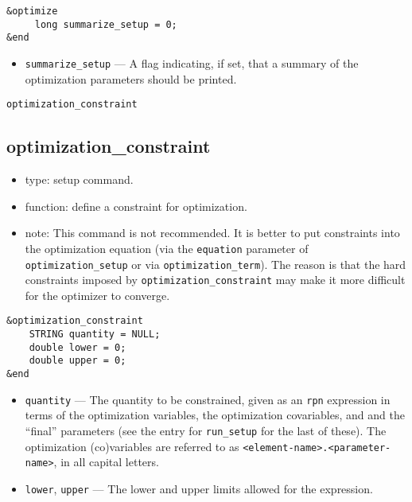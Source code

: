 \documentclass[11pt]{article}
\begin{document}
\begin{verbatim}
&optimize
     long summarize_setup = 0;
&end
\end{verbatim}

\begin{itemize}

\item \verb|summarize_setup| --- A flag indicating, if set, that a
summary of the optimization parameters should be printed.
\end{itemize}

\begin{latexonly}
\newpage
\begin{center}{\Large\verb|optimization_constraint|}\end{center}
\end{latexonly}
\subsection{optimization\_constraint}

\begin{itemize}
\item type: setup command.
\item function: define a constraint for optimization.
\item note: This command is not recommended.  It is better to put constraints
	into the optimization equation (via the \verb|equation| parameter of
	\verb|optimization_setup| or via \verb|optimization_term|).  The reason
	is that the hard constraints imposed by \verb|optimization_constraint|
	may make it more difficult for the optimizer to converge.
\end{itemize}

\begin{verbatim}
&optimization_constraint
    STRING quantity = NULL;
    double lower = 0;
    double upper = 0;
&end
\end{verbatim}

\begin{itemize}

\item \verb|quantity| --- The quantity to be constrained, given as an
{\tt rpn} expression in terms of the optimization variables, the
optimization covariables, and and the ``final'' parameters (see the
entry for \verb|run_setup| for the last of these).  The optimization
(co)variables are referred to as
\verb|<element-name>.<parameter-name>|, in all capital letters.

\item \verb|lower|, \verb|upper| --- The lower and upper limits
allowed for the expression.

\end{itemize}
\end{document}
